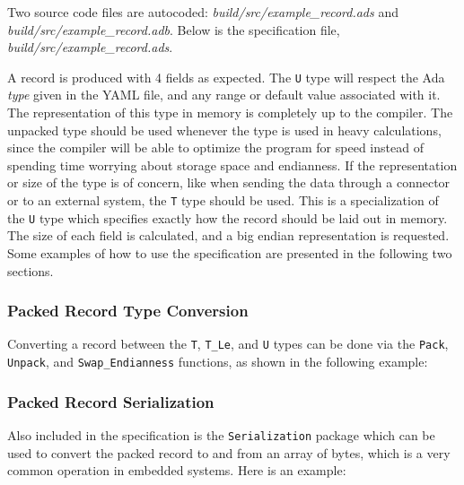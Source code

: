 Two source code files are autocoded: \textit{build/src/example\_record.ads} and \textit{build/src/example\_record.adb}. Below is the specification file, \textit{build/src/example\_record.ads}.


A record is produced with 4 fields as expected. The \texttt{U} type will respect the Ada \textit{type} given in the YAML file, and any range or default value associated with it. The representation of this type in memory is completely up to the compiler. The unpacked type should be used whenever the type is used in heavy calculations, since the compiler will be able to optimize the program for speed instead of spending time worrying about storage space and endianness. If the representation or size of the type is of concern, like when sending the data through a connector or to an external system, the \texttt{T} type should be used. This is a specialization of the \texttt{U} type which specifies exactly how the record should be laid out in memory. The size of each field is calculated, and a big endian representation is requested. \\ 

Some examples of how to use the specification are presented in the following two sections.

\subsubsection{Packed Record Type Conversion} \label{Packed Record Type Conversion}

Converting a record between the \texttt{T}, \texttt{T\_Le}, and \texttt{U} types can be done via the \texttt{Pack}, \texttt{Unpack}, and \texttt{Swap\_Endianness} functions, as shown in the following example:


\subsubsection{Packed Record Serialization} \label{Packed Record Serialization}

Also included in the specification is the \texttt{Serialization} package which can be used to convert the packed record to and from an array of bytes, which is a very common operation in embedded systems. Here is an example:


